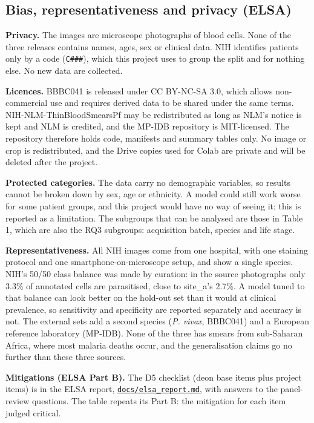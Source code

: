 \documentclass[11pt,a4paper]{article}
\begin{document}
\subsection{Bias, representativeness and privacy (ELSA)}

\textbf{Privacy.} The images are microscope photographs of blood cells. None of the three releases contains names, ages, sex or clinical data. NIH identifies patients only by a code (\texttt{C\#\#\#}), which this project uses to group the split and for nothing else. No new data are collected.

\textbf{Licences.} BBBC041 is released under CC BY-NC-SA 3.0, which allows non-commercial use and requires derived data to be shared under the same terms. NIH-NLM-ThinBloodSmearsPf may be redistributed as long as NLM's notice is kept and NLM is credited, and the MP-IDB repository is MIT-licensed. The repository therefore holds code, manifests and summary tables only. No image or crop is redistributed, and the Drive copies used for Colab are private and will be deleted after the project.

\textbf{Protected categories.} The data carry no demographic variables, so results cannot be broken down by sex, age or ethnicity. A model could still work worse for some patient groups, and this project would have no way of seeing it; this is reported as a limitation. The subgroups that can be analysed are those in Table 1, which are also the RQ3 subgroups: acquisition batch, species and life stage.

\textbf{Representativeness.} All NIH images come from one hospital, with one staining protocol and one smartphone-on-microscope setup, and show a single species. NIH's 50/50 class balance was made by curation: in the source photographs only 3.3\% of annotated cells are parasitised, close to site\_\allowbreak{}a's 2.7\%. A model tuned to that balance can look better on the hold-out set than it would at clinical prevalence, so sensitivity and specificity are reported separately and accuracy is not. The external sets add a second species (\emph{P. vivax}, BBBC041) and a European reference laboratory (MP-IDB). None of the three has smears from sub-Saharan Africa, where most malaria deaths occur, and the generalisation claims go no further than these three sources.

\textbf{Mitigations (ELSA Part B).} The D5 checklist (deon base items plus project items) is in the ELSA report, \href{https://github.com/noahtjonsk/malaria-cross-dataset/blob/main/docs/elsa_report.md}{\texttt{docs/\allowbreak{}elsa\_\allowbreak{}report.\allowbreak{}md}}, with answers to the panel-review questions. The table repeats its Part B: the mitigation for each item judged critical.
\end{document}
